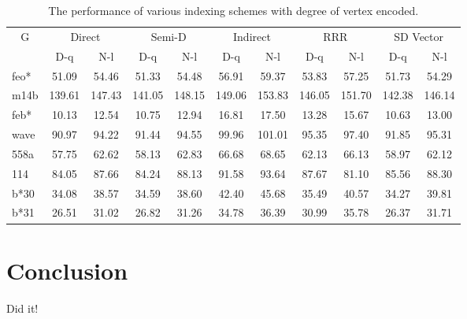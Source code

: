 \documentclass[12pt,glossary]{dalthesis}
\begin{document}
\begin{table}[h]
\caption{The performance of various indexing schemes with degree of vertex encoded.}
\label{my-label}
\begin{tabular}{|l||c|c||c|c||c|c||c|c||c|c|}
\hline
\multicolumn{1}{|c||}{\multirow{2}{*}{G}} & \multicolumn{2}{c||}{Direct} & \multicolumn{2}{c||}{Semi-D} & \multicolumn{2}{c||}{Indirect} & \multicolumn{2}{c||}{RRR} & \multicolumn{2}{c|}{SD Vector} \\
\cline{2-11}
\multicolumn{1}{|c||}{}                       & D-q          & N-l         & D-q          & N-l         & D-q           & N-l          & D-q        & N-l        & D-q           & N-l           \\ \hline
feo*                                    & 51.09        & 54.46       & 51.33        & 54.48       & 56.91         & 59.37        & 53.83      & 57.25      & 51.73         & 54.29         \\
m14b                                       & 139.61       & 147.43      & 141.05       & 148.15      & 149.06        & 153.83       & 146.05     & 151.70     & 142.38        & 146.14        \\
feb*                                     & 10.13        & 12.54       & 10.75        & 12.94       & 16.81         & 17.50        & 13.28      & 15.67      & 10.63         & 13.00         \\
wave                                       & 90.97        & 94.22       & 91.44        & 94.55       & 99.96         & 101.01       & 95.35      & 97.40      & 91.85         & 95.31         \\
558a                                       & 57.75        & 62.62       & 58.13        & 62.83       & 66.68         & 68.65        & 62.13      & 66.13      & 58.97         & 62.12         \\
114                                        & 84.05        & 87.66       & 84.24        & 88.13       & 91.58         & 93.64        & 87.67      & 81.10      & 85.56         & 88.30         \\
b*30                                   & 34.08        & 38.57       & 34.59        & 38.60       & 42.40         & 45.68        & 35.49      & 40.57      & 34.27         & 39.81         \\
b*31                                   & 26.51        & 31.02       & 26.82        & 31.26       & 34.78         & 36.39        & 30.99      & 35.78      & 26.37         & 31.71        \\ 	\hline
\end{tabular}
\end{table}



\chapter{Conclusion}

Did it!



\end{document}
